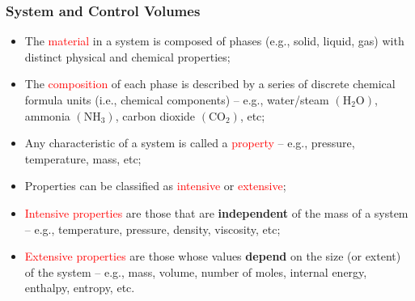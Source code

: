 \documentclass[10pt,compress]{beamer}
\begin{document}

\begin{frame}
 \frametitle{System and Control Volumes}
 \begin{itemize}
  \item <2-> The \textcolor{red}{material} in a system is composed of phases (e.g., solid, liquid, gas) with distinct physical and chemical properties;
  \item <3-> The \textcolor{red}{composition} of each phase is described by a series of discrete chemical formula units (i.e., chemical components) -- e.g., water/steam $\left(\right.$H$_{2}$O$\left.\right)$, ammonia $\left(\right.$NH$_{3}\left.\right)$, carbon dioxide $\left(\right.$CO$_{2}\left.\right)$, etc;
  \item <4-> Any characteristic of a system is called a \textcolor{red}{property} -- e.g., pressure, temperature, mass, etc;
  \item <5-> Properties can be classified as \textcolor{red}{intensive} or \textcolor{red}{extensive};
  \item <6-> \textcolor{red}{Intensive properties} are those that are {\bf independent} of the mass of a system -- e.g., temperature, pressure, density, viscosity, etc;
  \item <7-> \textcolor{red}{Extensive properties} are those whose values {\bf depend} on the size (or extent) of the system -- e.g., mass, volume, number of moles, internal energy, enthalpy, entropy, etc.  
 \end{itemize}
\end{frame}
\end{document}
